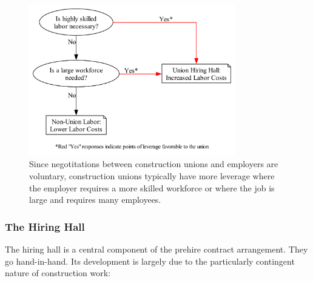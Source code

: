 \documentclass[12pt]{article}
\newcommand{\imageWidth}{0.8\textwidth}
\begin{document}
\begin{figure}[ht]
  \centering
  \includegraphics[width=\imageWidth]{images/union_power_red}
  \captionsetup{justification=centering, singlelinecheck=false, margin=2cm} 
  \caption[Union Leverage and Power]{Since negotitations between construction unions and employers are voluntary, construction unions typically have more leverage where the employer requires a more skilled workforce or where the job is large and requires many employees.}
  \label{fig:union_power_red}
\end{figure}

\subsubsection{The Hiring Hall}

The hiring hall is a central component of the prehire contract arrangement. They go hand-in-hand. Its development is largely due to the particularly contingent nature of construction work:
\end{document}

